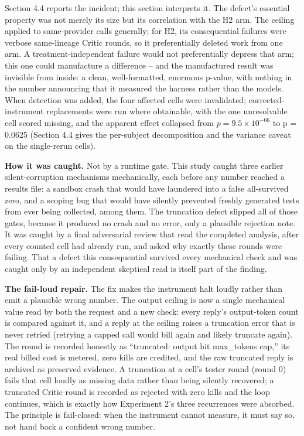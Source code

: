\documentclass[
  11pt,
]{article}
\begin{document}
Section 4.4 reports the incident; this section interprets it. The
defect's essential property was not merely its size but its correlation
with the H2 arm. The ceiling applied to same-provider calls generally;
for H2, its consequential failures were verbose same-lineage Critic
rounds, so it preferentially deleted work from one arm. A
treatment-independent failure would not preferentially depress that arm;
this one could manufacture a difference -- and the manufactured result
was invisible from inside: a clean, well-formatted, enormous p-value,
with nothing in the number announcing that it measured the harness
rather than the models. When detection was added, the four affected
cells were invalidated; corrected-instrument replacements were run where
obtainable, with the one unresolvable cell scored missing, and the
apparent effect collapsed from $p = 9.5 \times 10^{-66}$ to p = 0.0625
(Section 4.4 gives the per-subject decomposition and the variance caveat
on the single-rerun cells).

\textbf{How it was caught.} Not by a runtime gate. This study caught
three earlier silent-corruption mechanisms mechanically, each before any
number reached a results file: a sandbox crash that would have laundered
into a false all-survived zero, and a scoping bug that would have
silently prevented freshly generated tests from ever being collected,
among them. The truncation defect slipped all of those gates, because it
produced no crash and no error, only a plausible rejection note. It was
caught by a final adversarial review that read the completed analysis,
after every counted cell had already run, and asked why exactly these
rounds were failing. That a defect this consequential survived every
mechanical check and was caught only by an independent skeptical read is
itself part of the finding.

\textbf{The fail-loud repair.} The fix makes the instrument halt loudly
rather than emit a plausible wrong number. The output ceiling is now a
single mechanical value read by both the request and a new check: every
reply's output-token count is compared against it, and a reply at the
ceiling raises a truncation error that is never retried (retrying a
capped call would bill again and likely truncate again). The round is
recorded honestly as ``truncated: output hit max\_tokens cap,'' its real
billed cost is metered, zero kills are credited, and the raw truncated
reply is archived as preserved evidence. A truncation at a cell's tester
round (round 0) fails that cell loudly as missing data rather than being
silently recovered; a truncated Critic round is recorded as rejected
with zero kills and the loop continues, which is exactly how Experiment
2's three recurrences were absorbed. The principle is fail-closed: when
the instrument cannot measure, it must say so, not hand back a confident
wrong number.
\end{document}
